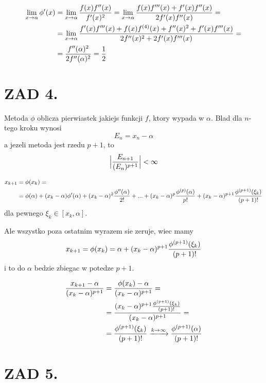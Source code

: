 \documentclass{article}[16pt]
\begin{document}
    \begin{align*}
        \lim\limits_{x\to\alpha}\phi'(x)&=\lim\limits_{x\to\alpha}{f(x)f''(x)\over f'(x)^2}=\lim\limits_{x\to\alpha}{f(x)f'''(x)+f'(x)f''(x)\over 2f'(x)f''(x)}=\\
        &=\lim\limits_{x\to\alpha}{f'(x)f'''(x)+f(x)f^{(4)}(x)+f''(x)^2+f'(x)f'''(x)\over 2f''(x)^2+2f'(x)f'''(x)}=\\
        &={f''(\alpha)^2\over 2f''(\alpha)^2}=\frac12
    \end{align*}


    \section*{ZAD 4.}

    Metoda $\phi$ oblicza pierwiastek jakiejs funkcji $f$, ktory wypada w $\alpha$. Blad dla $n$-tego kroku wynosi
    $$E_n=x_n-\alpha$$
    a jezeli metoda jest rzedu $p+1$, to
    \begin{align*}
        \Big |{E_{n+1}\over (E_n)^{p+1}}\Big |< \infty
    \end{align*}

    \begin{align*}
        x_{k+1}&=\phi(x_k)=\\
        &=\phi(\alpha)+(x_k-\alpha)\phi'(\alpha)+(x_k-\alpha)^2{\phi''(\alpha)\over 2!}+...+(x_k-\alpha)^p{\phi^{(p)}(\alpha)\over p!}+(x_k-\alpha)^{p+1}{\phi^{(p+1)}(\xi_k)\over (p+1)!}
    \end{align*}
    dla pewnego $\xi_k\in[x_k,\alpha]$.
    \medskip

    Ale wszystko poza ostatnim wyrazem sie zeruje, wiec mamy
    $$x_{k+1}=\phi(x_k)=\alpha+(x_k-\alpha)^{p+1}{\phi^{(p+1)}(\xi_k)\over(p+1)!}$$
    i to do $\alpha$ bedzie zbiegac w potedze $p+1$.

    \begin{align*}
        {x_{k+1}-\alpha\over (x_k-\alpha)^{p+1}}&={\phi(x_k)-\alpha\over (x_k-\alpha)^{p+1}}=\\
        &={(x_k-\alpha)^{p+1}{\phi^{(p+1)}(\xi_k)\over(p+1)!}\over (x_k-\alpha)^{p+1}}=\\
        &={\phi^{(p+1)}(\xi_k)\over(p+1)!}\xrightarrow[]{k\to\infty}{\phi^{(p+1)}(\alpha)\over(p+1)!}
    \end{align*}

    
    \section*{ZAD 5.}
\end{document}
